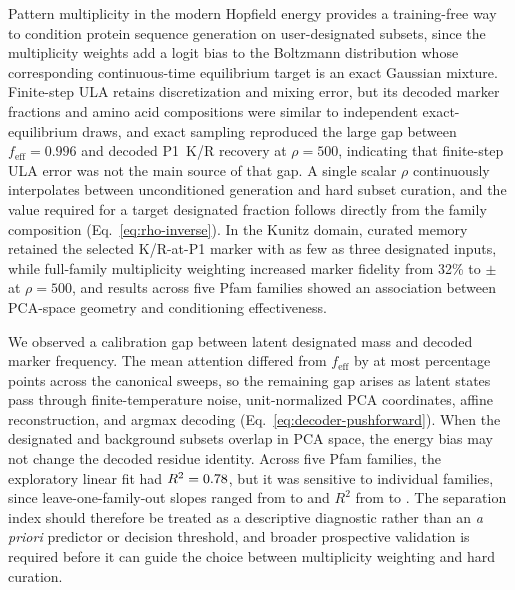 Pattern multiplicity in the modern Hopfield energy provides a training-free way to condition
protein sequence generation on user-designated subsets, since the multiplicity weights add a
logit bias to the Boltzmann distribution whose corresponding continuous-time equilibrium
target is an exact Gaussian mixture. Finite-step ULA retains discretization and mixing error,
but its decoded marker fractions and amino acid compositions were similar to independent
exact-equilibrium draws, and exact sampling reproduced the large gap between
$f_{\mathrm{eff}}=0.996$ and decoded P1~K/R recovery at $\rho=500$, indicating that
finite-step ULA error was not the main source of that gap. A single scalar $\rho$ continuously
interpolates between unconditioned generation and hard subset curation, and the value required
for a target designated fraction follows directly from the family composition
(Eq.~\ref{eq:rho-inverse}). In the Kunitz domain, curated memory retained the selected
K/R-at-P1 marker with as few as three designated inputs, while full-family multiplicity
weighting increased marker fidelity from 32\% to \KunitzFobsFiveHundred{} $\pm$
\KunitzFobsFiveHundredSD{} at $\rho = 500$, and results across five Pfam families showed an
association between PCA-space geometry and conditioning effectiveness.

We observed a calibration gap between latent designated mass and decoded marker frequency.
The mean attention differed from $f_{\mathrm{eff}}$ by at most \AttnMaxDevPts{} percentage
points across the canonical sweeps, so the remaining gap arises as latent states pass through
finite-temperature noise, unit-normalized PCA coordinates, affine reconstruction, and argmax
decoding (Eq.~\ref{eq:decoder-pushforward}). When the designated and background subsets
overlap in PCA space, the energy bias may not change the decoded residue identity. Across five
Pfam families, the exploratory linear fit had $R^{2}=0.78$, but it was sensitive to
individual families, since leave-one-family-out slopes ranged from \RelationLooSlopeMin{} to
\RelationLooSlopeMax{} and $R^{2}$ from \RelationLooRsqMin{} to \RelationLooRsqMax{}. The
separation index should therefore be treated as a descriptive diagnostic rather than an
\emph{a priori} predictor or decision threshold, and broader prospective validation is
required before it can guide the choice between multiplicity weighting and hard curation.

